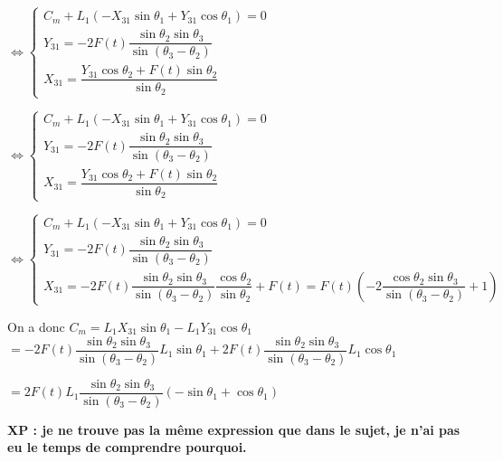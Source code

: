 \begin{corrige}



$\Leftrightarrow \left\{\begin{array}{l}
 C_m + L_1\left(-X_{31}\sin \theta_1+Y_{31} \cos \theta_1 \right) =0 \\
Y_{31}  =-2F(t)\dfrac{\sin \theta_2\sin\theta_3 }{\sin \left(\theta_3-\theta_2 \right)} \\
 X_{31} = \dfrac{Y_{31}\cos\theta_2+ F(t)\sin \theta_2}{\sin \theta_2}
\end{array}
\right.
$


$\Leftrightarrow \left\{\begin{array}{l}
 C_m + L_1\left(-X_{31}\sin \theta_1+Y_{31} \cos \theta_1 \right) =0 \\
Y_{31}  =-2F(t)\dfrac{\sin \theta_2\sin\theta_3}{\sin \left(\theta_3-\theta_2 \right)}  \\
 X_{31} = \dfrac{Y_{31}\cos\theta_2+ F(t)\sin \theta_2}{\sin \theta_2}
\end{array}
\right.
$

$\Leftrightarrow \left\{\begin{array}{l}
 C_m + L_1\left(-X_{31}\sin \theta_1+Y_{31} \cos \theta_1 \right) =0 \\
Y_{31}  =-2F(t)\dfrac{\sin \theta_2\sin\theta_3}{\sin \left(\theta_3-\theta_2 \right)}  \\
 X_{31} = -2F(t)\dfrac{\sin \theta_2\sin\theta_3}{\sin \left(\theta_3-\theta_2 \right)} \dfrac{\cos\theta_2}{\sin \theta_2}+ F(t) =F(t) \left(-2\dfrac{\cos\theta_2\sin\theta_3}{\sin \left(\theta_3-\theta_2 \right)} 
 +1\right)
\end{array}
\right.
$

On a donc 
$ C_m = L_1X_{31}\sin \theta_1- L_1Y_{31} \cos \theta_1 $ 
$ = -2F(t)\dfrac{\sin \theta_2\sin\theta_3}{\sin \left(\theta_3-\theta_2 \right)} L_1\sin \theta_1+ 2F(t)\dfrac{\sin \theta_2\sin\theta_3}{\sin \left(\theta_3-\theta_2 \right)}  L_1 \cos \theta_1 $ 

$ = 2F(t) L_1\dfrac{\sin \theta_2\sin\theta_3}{\sin \left(\theta_3-\theta_2 \right)}\left(-\sin \theta_1+  \cos \theta_1\right) $ 

\textbf{XP : je ne trouve pas la même expression que dans le sujet, je n'ai pas eu le temps de comprendre pourquoi.}


\end{corrige}
\else
\fi
\else
\fi

